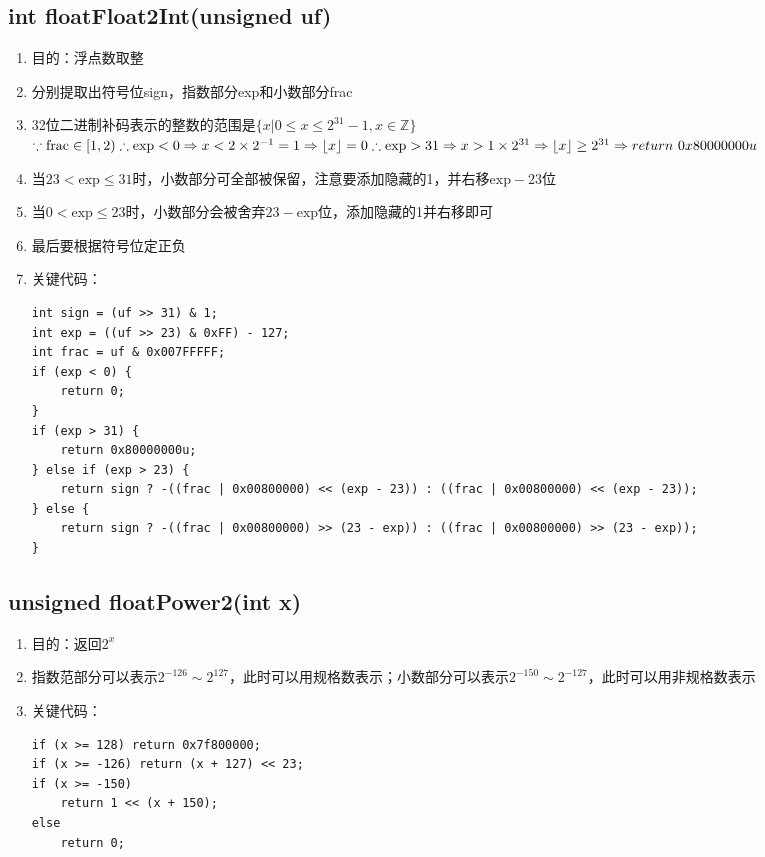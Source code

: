 \documentclass[12pt, a4paper, oneside]{ctexart}
\begin{document}
\subsection{int floatFloat2Int(unsigned uf)}
\begin{enumerate}
    \item 目的：浮点数取整
    \item 分别提取出符号位sign，指数部分exp和小数部分frac
    \item 32位二进制补码表示的整数的范围是$\{x|0\le x \le 2^{31}-1, x \in \mathbb{Z}\}$\\
          $\because \mathrm{frac} \in [1,2)\\
          \therefore \mathrm{exp} < 0 \Rightarrow x < 2 \times 2^{-1} = 1 \Rightarrow \lfloor x \rfloor = 0\\
          \therefore \mathrm{exp} > 31 \Rightarrow x > 1 \times 2^{31}\Rightarrow \lfloor x \rfloor \ge 2^{31} \Rightarrow return\ 0x80000000u$
    \item 当$23 < \mathrm{exp} \le 31$时，小数部分可全部被保留，注意要添加隐藏的1，并右移$\mathrm{exp} - 23$位
    \item 当$0<\mathrm{exp}\le 23$时，小数部分会被舍弃$23-\mathrm{exp}$位，添加隐藏的1并右移即可
    \item 最后要根据符号位定正负
    \item 关键代码：
\begin{lstlisting}
int sign = (uf >> 31) & 1;  
int exp = ((uf >> 23) & 0xFF) - 127;  
int frac = uf & 0x007FFFFF; 
if (exp < 0) {
    return 0;  
}
if (exp > 31) {
    return 0x80000000u;  
} else if (exp > 23) {
    return sign ? -((frac | 0x00800000) << (exp - 23)) : ((frac | 0x00800000) << (exp - 23));  
} else {
    return sign ? -((frac | 0x00800000) >> (23 - exp)) : ((frac | 0x00800000) >> (23 - exp));  
}  
\end{lstlisting}
\end{enumerate}
\subsection{unsigned floatPower2(int x)}
\begin{enumerate}
    \item 目的：返回$2^x$
    \item 指数范部分可以表示$2^{-126}\sim 2^{127}$，此时可以用规格数表示；小数部分可以表示$2^{-150}\sim 2^{-127}$，此时可以用非规格数表示
    \item 关键代码：
\begin{lstlisting}
if (x >= 128) return 0x7f800000;  
if (x >= -126) return (x + 127) << 23; 
if (x >= -150)          
    return 1 << (x + 150);
else
    return 0;
\end{lstlisting}
\end{enumerate}
\end{document}
